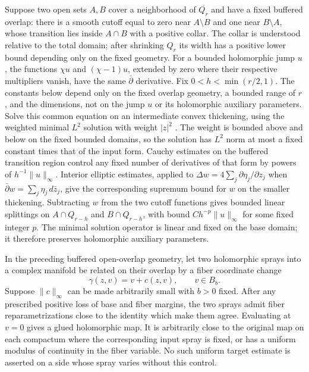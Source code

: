 Suppose two open sets
$A,B$ cover a neighborhood of $\overline{Q_r}$ and have a fixed buffered
overlap: there is a smooth cutoff equal to zero near $A\setminus B$ and
one near $B\setminus A$, whose transition lies inside $A\cap B$ with a
positive collar. The collar is understood relative to the total domain;
after shrinking $Q_r$ its width has a positive lower bound depending
only on the fixed geometry. For a bounded holomorphic jump $u$,
the functions $\chi u$ and $(\chi-1)u$, extended by zero where their
respective multipliers vanish, have the same $\bar\partial$ derivative.
Fix $0<h<\min(r/2,1)$. The constants below depend only on the fixed
overlap geometry, a bounded range of $r$, and the dimensions, not on
the jump $u$ or its holomorphic auxiliary parameters.
Solve this common equation on an intermediate convex thickening,
using the weighted minimal $L^2$ solution with weight $|z|^2$
\cite[Theorem~2.2.1$'$]{HormanderLTwo}. The weight is bounded above
and below on the fixed bounded domains, so the solution has $L^2$
norm at most a fixed constant times that of the input form.
Cauchy estimates on the buffered transition region control any fixed
number of derivatives of that form by powers of $h^{-1}\|u\|_\infty$.
Interior elliptic estimates, applied to
$\Delta w=4\sum_j\partial\eta_j/\partial z_j$ when
$\bar\partial w=\sum_j\eta_j\,d\bar z_j$, give the corresponding
supremum bound for $w$ on the smaller thickening. Subtracting $w$
from the two cutoff functions gives bounded linear splittings on
$A\cap Q_{r-h}$ and $B\cap Q_{r-h}$, with bound
$Ch^{-p}\|u\|_\infty$ for some fixed integer $p$.
The minimal solution operator is linear and fixed on the base domain;
it therefore preserves holomorphic auxiliary parameters.

\begin{lemma}\label{glue:open}
In the preceding buffered open-overlap geometry, let two holomorphic
sprays into a complex manifold be related on their overlap by a fiber
coordinate change
\[
 \gamma(z,v)=v+c(z,v),\qquad v\in B_b.
\]
Suppose $\|c\|_\infty$ can be made arbitrarily small with $b>0$ fixed.
After any prescribed positive loss of base and fiber margins, the two
sprays admit fiber reparametrizations close to the identity which make
them agree. Evaluating at $v=0$ gives a glued holomorphic map. It is
arbitrarily close to the original map on each compactum where the
corresponding input spray is fixed, or has a uniform modulus of
continuity in the fiber variable. No such uniform target estimate is
asserted on a side whose spray varies without this control.
\end{lemma}


